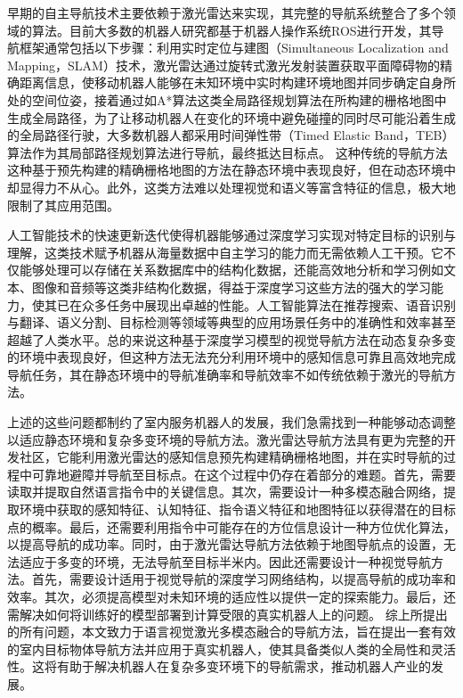 	
	早期的自主导航技术主要依赖于激光雷达来实现，其完整的导航系统整合了多个领域的算法。目前大多数的机器人研究都基于机器人操作系统ROS\cite{ROS2018}进行开发，其导航框架通常包括以下步骤：利用实时定位与建图（Simultaneous Localization and Mapping，SLAM）\cite{dellaert1999monte, thrun2001robust}技术，激光雷达通过旋转式激光发射装置获取平面障碍物的精确距离信息，使移动机器人能够在未知环境中实时构建环境地图并同步确定自身所处的空间位姿，接着通过如A*算法\cite{hart1968formal}这类全局路径规划算法在所构建的栅格地图中生成全局路径，为了让移动机器人在变化的环境中避免碰撞的同时尽可能沿着生成的全局路径行驶，大多数机器人都采用时间弹性带（Timed Elastic Band，TEB）算法\cite{rosmann2013efficient}作为其局部路径规划算法进行导航，最终抵达目标点。
	这种传统的导航方法这种基于预先构建的精确栅格地图的方法在静态环境中表现良好，但在动态环境中却显得力不从心。此外，这类方法难以处理视觉和语义等富含特征的信息，极大地限制了其应用范围。

	人工智能技术的快速更新迭代使得机器能够通过深度学习实现对特定目标的识别与理解，这类技术赋予机器从海量数据中自主学习的能力而无需依赖人工干预。它不仅能够处理可以存储在关系数据库中的结构化数据，还能高效地分析和学习例如文本、图像和音频等这类非结构化数据，得益于深度学习这些方法的强大的学习能力，使其已在众多任务中展现出卓越的性能。人工智能算法在推荐搜索、语音识别与翻译、语义分割、目标检测等领域等典型的应用场景任务中的准确性和效率甚至超越了人类水平。总的来说这种基于深度学习模型的视觉导航方法在动态复杂多变的环境中表现良好，但这种方法无法充分利用环境中的感知信息可靠且高效地完成导航任务，其在静态环境中的导航准确率和导航效率不如传统依赖于激光的导航方法。

	上述的这些问题都制约了室内服务机器人的发展，我们急需找到一种能够动态调整以适应静态环境和复杂多变环境的导航方法。激光雷达导航方法具有更为完整的开发社区，它能利用激光雷达的感知信息预先构建精确栅格地图，并在实时导航的过程中可靠地避障并导航至目标点。在这个过程中仍存在着部分的难题。首先，需要读取并提取自然语言指令中的关键信息。其次，需要设计一种多模态融合网络，提取环境中获取的感知特征、认知特征、指令语义特征和地图特征以获得潜在的目标点的概率。最后，还需要利用指令中可能存在的方位信息设计一种方位优化算法，以提高导航的成功率。同时，由于激光雷达导航方法依赖于地图导航点的设置，无法适应于多变的环境，无法导航至目标半米内。因此还需要设计一种视觉导航方法。首先，需要设计适用于视觉导航的深度学习网络结构，以提高导航的成功率和效率。其次，必须提高模型对未知环境的适应性以提供一定的探索能力。最后，还需解决如何将训练好的模型部署到计算受限的真实机器人上的问题。
	综上所提出的所有问题，本文致力于语言视觉激光多模态融合的导航方法，旨在提出一套有效的室内目标物体导航方法并应用于真实机器人，使其具备类似人类的全局性和灵活性。这将有助于解决机器人在复杂多变环境下的导航需求，推动机器人产业的发展。

